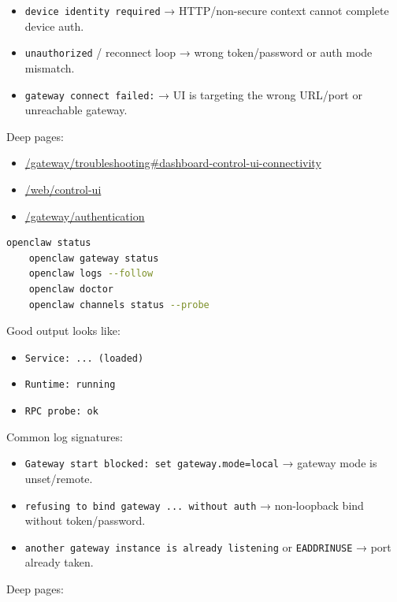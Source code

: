 \begin{itemize}
  \item \texttt{device identity required} → HTTP/non-secure context cannot complete device auth.
  \item \texttt{unauthorized} / reconnect loop → wrong token/password or auth mode mismatch.
  \item \texttt{gateway connect failed:} → UI is targeting the wrong URL/port or unreachable gateway.
\end{itemize}


Deep pages:

\begin{itemize}
  \item \href{/gateway/troubleshooting\#dashboard-control-ui-connectivity}{/gateway/troubleshooting\#dashboard-control-ui-connectivity}
  \item \href{/web/control-ui}{/web/control-ui}
  \item \href{/gateway/authentication}{/gateway/authentication}
\end{itemize}



\begin{lstlisting}[language=bash]
    openclaw status
    openclaw gateway status
    openclaw logs --follow
    openclaw doctor
    openclaw channels status --probe
\end{lstlisting}


Good output looks like:

\begin{itemize}
  \item \texttt{Service: ... (loaded)}
  \item \texttt{Runtime: running}
  \item \texttt{RPC probe: ok}
\end{itemize}


Common log signatures:

\begin{itemize}
  \item \texttt{Gateway start blocked: set gateway.mode=local} → gateway mode is unset/remote.
  \item \texttt{refusing to bind gateway ... without auth} → non-loopback bind without token/password.
  \item \texttt{another gateway instance is already listening} or \texttt{EADDRINUSE} → port already taken.
\end{itemize}


Deep pages:

